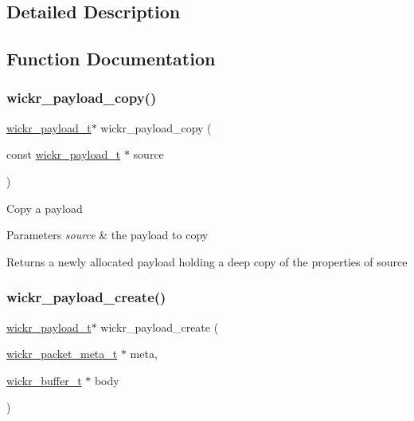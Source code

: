 \subsection{Detailed Description}


\subsection{Function Documentation}
\mbox{\label{group__wickr__payload_ga96e1b0eabf307d112985946cbe2f6969}} 
\subsubsection{\texorpdfstring{wickr\_payload\_copy()}{wickr\_payload\_copy()}}
{\footnotesize\ttfamily \mbox{\hyperlink{structwickr__payload}{wickr\+\_\+payload\+\_\+t}}$\ast$ wickr\+\_\+payload\+\_\+copy (\begin{DoxyParamCaption}\item[{const \mbox{\hyperlink{structwickr__payload}{wickr\+\_\+payload\+\_\+t}} $\ast$}]{source }\end{DoxyParamCaption})}

Copy a payload


\begin{DoxyParams}{Parameters}
{\em source} & the payload to copy \\
\hline
\end{DoxyParams}
\begin{DoxyReturn}{Returns}
a newly allocated payload holding a deep copy of the properties of \textquotesingle{}source\textquotesingle{} 
\end{DoxyReturn}
\mbox{\label{group__wickr__payload_gad7d51d39a8477d87557536ff42399186}} 
\subsubsection{\texorpdfstring{wickr\_payload\_create()}{wickr\_payload\_create()}}
{\footnotesize\ttfamily \mbox{\hyperlink{structwickr__payload}{wickr\+\_\+payload\+\_\+t}}$\ast$ wickr\+\_\+payload\+\_\+create (\begin{DoxyParamCaption}\item[{\mbox{\hyperlink{structwickr__packet__meta}{wickr\+\_\+packet\+\_\+meta\+\_\+t}} $\ast$}]{meta,  }\item[{\mbox{\hyperlink{structwickr__buffer}{wickr\+\_\+buffer\+\_\+t}} $\ast$}]{body }\end{DoxyParamCaption})}


